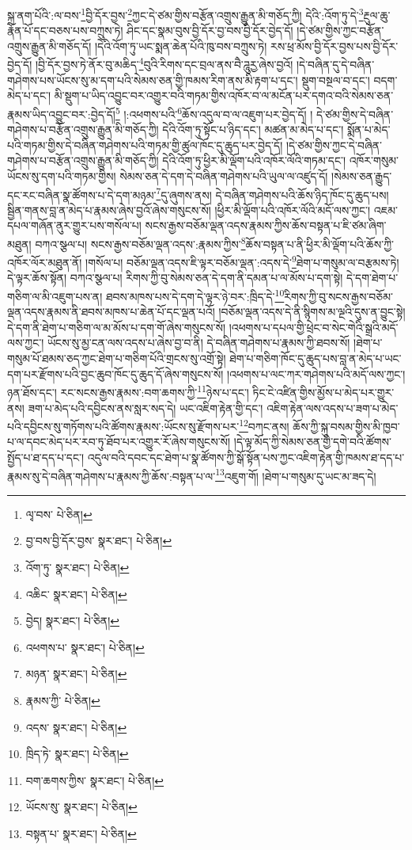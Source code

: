 སྐྲ་ནག་པོའི་:ལ་བས་\footnote{ལྭ་བས་  པེ་ཅིན། }བྱི་དོར་བྱས་\footnote{བྱ་བས་བྱི་དོར་བྱས་  སྣར་ཐང་།  པེ་ཅིན། }ཀྱང་དེ་ཙམ་གྱིས་བརྩོན་འགྲུས་རྒྱུན་མི་གཅོད་ཀྱི། དེའི་:འོག་ཏུ་དེ་\footnote{འོག་ཏུ་  སྣར་ཐང་།  པེ་ཅིན། }རྔུལ་ཆུ་རྣོན་པོ་དང་བཅས་པས་བཀྲུས་ཏེ། ཤིང་དང་སྣམ་བུས་བྱི་དོར་བྱ་བས་བྱི་དོར་བྱེད་དོ། །དེ་ཙམ་གྱིས་ཀྱང་བརྩོན་འགྲུས་རྒྱུན་མི་གཅོད་དོ། །དེའི་འོག་ཏུ་ཡང་སྨན་ཆེན་པོའི་ཁུ་བས་བཀྲུས་ཏེ། རས་ཕྲ་མོས་བྱི་དོར་བྱས་པས་བྱི་དོར་བྱེད་དོ། །བྱི་དོར་བྱས་ཏེ་ནོར་བུ་མཆིད་\footnote{འཆིང་  སྣར་ཐང་།  པེ་ཅིན། }བུའི་རིགས་དང་བྲལ་ནས་བཻ་ཌཱུརྱ་ཞེས་བྱའོ། །དེ་བཞིན་དུ་དེ་བཞིན་གཤེགས་པས་ཡོངས་སུ་མ་དག་པའི་སེམས་ཅན་གྱི་ཁམས་རིག་ནས་མི་རྟག་པ་དང་། སྡུག་བསྔལ་བ་དང་། བདག་མེད་པ་དང་། མི་སྡུག་པ་ཡིད་འབྱུང་བར་འགྱུར་བའི་གཏམ་གྱིས་འཁོར་བ་ལ་མངོན་པར་དགའ་བའི་སེམས་ཅན་རྣམས་ཡིད་འབྱུང་བར་:བྱེད་དོ།\footnote{བྱེད།  སྣར་ཐང་།  པེ་ཅིན། } །:འཕགས་པའི་\footnote{འཕགས་པ་  སྣར་ཐང་།  པེ་ཅིན། }ཆོས་འདུལ་བ་ལ་འཇུག་པར་བྱེད་དོ། །
དེ་ཙམ་གྱིས་དེ་བཞིན་གཤེགས་པ་བརྩོན་འགྲུས་རྒྱུན་མི་གཅོད་ཀྱི། དེའི་འོག་ཏུ་སྟོང་པ་ཉིད་དང་། མཚན་མ་མེད་པ་དང་། སྨོན་པ་མེད་པའི་གཏམ་གྱིས་དེ་བཞིན་གཤེགས་པའི་གཏམ་གྱི་ཚུལ་ཁོང་དུ་ཆུད་པར་བྱེད་དོ། །དེ་ཙམ་གྱིས་ཀྱང་དེ་བཞིན་གཤེགས་པ་བརྩོན་འགྲུས་རྒྱུན་མི་གཅོད་ཀྱི། དེའི་འོག་ཏུ་ཕྱིར་མི་ལྡོག་པའི་འཁོར་ལོའི་གཏམ་དང་། འཁོར་གསུམ་ཡོངས་སུ་དག་པའི་གཏམ་གྱིས། སེམས་ཅན་དེ་དག་དེ་བཞིན་གཤེགས་པའི་ཡུལ་ལ་འཛུད་དོ། །སེམས་ཅན་རྒྱུད་དང་རང་བཞིན་སྣ་ཚོགས་པ་དེ་དག་མཉམ་\footnote{མཉན་  སྣར་ཐང་།  པེ་ཅིན། }དུ་ཞུགས་ནས། དེ་བཞིན་གཤེགས་པའི་ཆོས་ཉིད་ཁོང་དུ་ཆུད་པས། སྦྱིན་གནས་བླ་ན་མེད་པ་རྣམས་ཞེས་བྱའོ་ཞེས་གསུངས་སོ། །ཕྱིར་མི་ལྡོག་པའི་འཁོར་ལོའི་མདོ་ལས་ཀྱང་། འཇམ་དཔལ་གཞོན་ནུར་གྱུར་པས་གསོལ་པ། སངས་རྒྱས་བཅོམ་ལྡན་འདས་རྣམས་ཀྱིས་ཆོས་བསྟན་པ་ཇི་ཙམ་ཞིག་མཐུན། བཀའ་སྩལ་པ། སངས་རྒྱས་བཅོམ་ལྡན་འདས་:རྣམས་ཀྱིས་\footnote{རྣམས་ཀྱི་  པེ་ཅིན། }ཆོས་བསྟན་པ་ནི་ཕྱིར་མི་ལྡོག་པའི་ཆོས་ཀྱི་འཁོར་ལོར་མཐུན་ནོ། །གསོལ་པ། བཅོམ་ལྡན་འདས་ཇི་ལྟར་བཅོམ་ལྡན་:འདས་དེ་\footnote{འདས་  སྣར་ཐང་།  པེ་ཅིན། }ཐེག་པ་གསུམ་ལ་བརྩམས་ཏེ། དེ་ལྟར་ཆོས་སྟོན། བཀའ་སྩལ་པ། རིགས་ཀྱི་བུ་སེམས་ཅན་དེ་དག་ནི་དམན་པ་ལ་མོས་པ་དག་སྟེ། དེ་དག་ཐེག་པ་གཅིག་ལ་མི་འཇུག་པས་ན། ཐབས་མཁས་པས་དེ་དག་དེ་ལྟར་ཉེ་བར་:ཁྲིད་དེ་\footnote{ཁྲིད་ཏེ་  སྣར་ཐང་།  པེ་ཅིན། }རིགས་ཀྱི་བུ་སངས་རྒྱས་བཅོམ་ལྡན་འདས་རྣམས་ནི་ཐབས་མཁས་པ་ཆེན་པོ་དང་ལྡན་པའོ། །བཅོམ་ལྡན་འདས་དེ་ནི་སྙིགས་མ་ལྔའི་དུས་ན་བྱུང་སྟེ། དེ་དག་ནི་ཐེག་པ་གཅིག་ལ་མ་མོས་པ་དག་གོ་ཞེས་གསུངས་སོ། །འཕགས་པ་དཔལ་གྱི་ཕྲེང་བ་སེང་གེའི་སྒྲའི་མདོ་ལས་ཀྱང་། ཡོངས་སུ་མྱ་ངན་ལས་འདས་པ་ཞེས་བྱ་བ་ནི། དེ་བཞིན་གཤེགས་པ་རྣམས་ཀྱི་ཐབས་སོ། །ཐེག་པ་གསུམ་པོ་ཐམས་ཅད་ཀྱང་ཐེག་པ་གཅིག་པོའི་གྲངས་སུ་འགྲོ་སྟེ། ཐེག་པ་གཅིག་ཁོང་དུ་ཆུད་པས་བླ་ན་མེད་པ་ཡང་དག་པར་རྫོགས་པའི་བྱང་ཆུབ་ཁོང་དུ་ཆུད་དོ་ཞེས་གསུངས་སོ། །འཕགས་པ་ལང་ཀར་གཤེགས་པའི་མདོ་ལས་ཀྱང་། ཉན་ཐོས་དང་། རང་སངས་རྒྱས་རྣམས་:བག་ཆགས་ཀྱི་\footnote{བག་ཆགས་ཀྱིས་  སྣར་ཐང་།  པེ་ཅིན། }ཉེས་པ་དང་། ཏིང་ངེ་འཛིན་གྱིས་མྱོས་པ་མེད་པར་གྱུར་ནས། ཟག་པ་མེད་པའི་དབྱིངས་ནས་སླར་སད་དེ། ཡང་འཇིག་རྟེན་གྱི་དང་། འཇིག་རྟེན་ལས་འདས་པ་ཟག་པ་མེད་པའི་དབྱིངས་སུ་གཏོགས་པའི་ཚོགས་རྣམས་:ཡོངས་སུ་རྫོགས་པར་\footnote{ཡོངས་སུ་  སྣར་ཐང་།  པེ་ཅིན། }བཀང་ནས། ཆོས་ཀྱི་སྐུ་བསམ་གྱིས་མི་ཁྱབ་པ་ལ་དབང་མེད་པར་རབ་ཏུ་ཐོབ་པར་འགྱུར་རོ་ཞེས་གསུངས་སོ། །དེ་ལྟ་མོད་ཀྱི་སེམས་ཅན་གྱི་དགེ་བའི་ཚོགས་སྤྱོད་པ་ཐ་དད་པ་དང་། འདུལ་བའི་དབང་དང་ཐེག་པ་སྣ་ཚོགས་ཀྱི་སྒོ་སྟོན་པས་ཀྱང་འཇིག་རྟེན་གྱི་ཁམས་ཐ་དད་པ་རྣམས་སུ་དེ་བཞིན་གཤེགས་པ་རྣམས་ཀྱི་ཆོས་:བསྟན་པ་ལ་\footnote{བསྟན་པ་  སྣར་ཐང་།  པེ་ཅིན། }འཇུག་གོ། །ཐེག་པ་གསུམ་དུ་ཡང་མ་ཟད་དེ། 